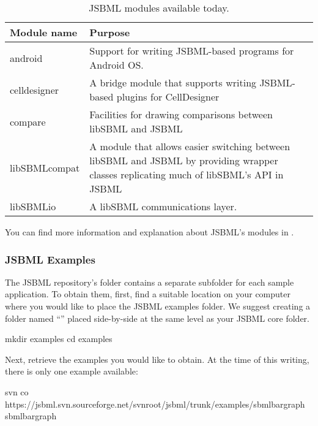 \begin{table}[thb]
  \caption{JSBML modules available today.}
  \label{tab:jsbml-modules}
  \centering
  \begin{tabular}{>{\ttfamily}lp{5.25in}}
    \toprule
    \textbf{\sffamily Module name} & \textbf{Purpose} \\
    \midrule
    android
    & Support for writing JSBML-based programs for Android OS.
    \\
    celldesigner
    & A bridge module that supports writing JSBML-based
    plugins for CellDesigner~\cite{Funahashi2003}
    \\
    compare
    & Facilities for drawing comparisons between libSBML and JSBML
    \\
    libSBMLcompat
    & A module that allows easier switching between libSBML and JSBML by
    providing wrapper classes replicating much of libSBML's API in JSBML
    \\
    libSBMLio
    & A libSBML communications layer.
    \\
    \bottomrule
  \end{tabular}
\end{table}

You can find more information and explanation about JSBML's modules in .


\subsubsection{JSBML Examples}
\label{sec:jsbml-repo-examples}

The JSBML repository's  folder contains a separate
subfolder for each sample application.  To obtain them, first, find a
suitable location on your computer where you would like to place the JSBML
examples folder.  We suggest creating a folder named ``''
placed side-by-side at the same level as your JSBML core folder.

\begin{example}[style=bash, title={Creating a folder for the examples.}]
mkdir examples
cd examples
\end{example}

Next, retrieve the examples you would like to obtain.  At the time of this
writing, there is only one example available:

\begin{example}[style=bash, title={Retrieving the \emph{SBML Bar Graph}
    example application.}] 
svn co https://jsbml.svn.sourceforge.net/svnroot/jsbml/trunk/examples/sbmlbargraph sbmlbargraph
\end{example}

